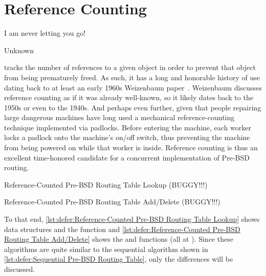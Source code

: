 
\section{Reference Counting}
\label{sec:defer:Reference Counting}
%
\epigraph{I am never letting you go!}{Unknown}

tracks the number of references to a given object in
order to prevent that object from being prematurely freed.
As such, it has a long and honorable history of use dating back to
at least an early 1960s Weizenbaum
paper~\cite{Weizenbaum:1963:SLP:367593.367617}.
Weizenbaum discusses reference counting as if it was already well-known,
so it likely dates back to the 1950s or even to the 1940s.
And perhaps even further, given that people repairing large dangerous
machines have long used a mechanical reference-counting technique
implemented via padlocks.
Before entering the machine, each worker locks a padlock onto the
machine's on/off switch, thus preventing the machine from being powered
on while that worker is inside.
Reference counting is thus an excellent time-honored candidate for a
concurrent implementation of Pre-BSD routing.

\begin{listing}

\caption{Reference-Counted Pre-BSD Routing Table Lookup (BUGGY!!!)}
\label{lst:defer:Reference-Counted Pre-BSD Routing Table Lookup}
\end{listing}

\begin{listing}

\caption{Reference-Counted Pre-BSD Routing Table Add\slash Delete (BUGGY!!!)}
\label{lst:defer:Reference-Counted Pre-BSD Routing Table Add/Delete}
\end{listing}

To that end,
\cref{lst:defer:Reference-Counted Pre-BSD Routing Table Lookup}
shows data structures and the  function and
\cref{lst:defer:Reference-Counted Pre-BSD Routing Table Add/Delete}
shows the  and  functions
(all at ).
Since these algorithms are quite similar to the sequential algorithm
shown in
\cref{lst:defer:Sequential Pre-BSD Routing Table},
only the differences will be discussed.


